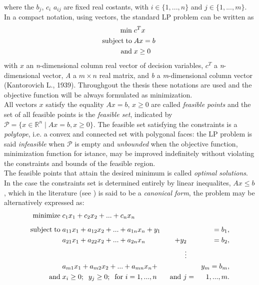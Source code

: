 \documentclass[a4paper,10 pt,titlepage,twoside]{book}
\theoremstyle{plain}
\theoremstyle{definition}
\theoremstyle{remark}
\begin{document}
where the $b_{j}$, $c_{i}$  $a_{ij}$ are fixed real costants, with $i \in\{1,...,n\}$ and $j\in\{1,...,m\}$.\\ In a compact notation, using vectors, the standard LP problem can be written as
\begin{equation}\label{(Prim)}
 \begin{split}
\min\;&c^{T}x\\
\text{subject\;to\;}&Ax= b\;\\\text{and\;}&x\geq0
 \end{split}
\end{equation}
with $x$ an \textit{n}-dimensional column real vector of decision variables, $c^
{T}$ a \textit{n}-dimensional vector, \textit{A} a $m \times n$ real matrix, and \textit{b} a \textit{m}-dimensional column vector (Kantorovich L., 1939).
Throughgout the thesis these notations are used and the objective function will be always formulated as minimization.\\
All vectors $x$ satisfy the equality $Ax = b$, $x\geq0$ are called \textit{feasible points} and the set of all feasible points is the \textit{feasible set}, indicated by $\mathcal{P}=\lbrace x\in\mathbb{R}^{n}\; |\; Ax = b , x \geq0\rbrace$. The feasible set satisfying the constraints is a \textit{polytope}, i.e. a convex and connected set with polygonal faces: the LP problem is said \textit{infeasible} when $\mathcal{P}$ is empty and \textit{unbounded} when the objective function, minimization function for istance, may be improved indefinitely without violating the constraints and bounds of the feasible region.\\The feasible points that attain the desired minimum is
called \textit{optimal solutions}.\\
In the case the constraints set is determined entirely by linear inequalites, $Ax \leq b$, which in the literature (see \cite{W}) is said to be a \textit{canonical form}, the problem may be alternatively expressed as:
\begin{alignat*}{3}
\text{minimize\;}&c_1 x_1 + c_2 x_2+ ...+c_n x_n&&&\\[1.8mm]
\text{subject\;to\;}&a_{11} x_1 +a_{12}x_2 + ... +a_{1n}x_n +y_{1}&&&= b_1,\\
		   	&a_{21}x_1+a_{22}x_2+ ... +a_{2n}x_n&+y_{2}&&= b_2,\\
&&\;\;\;\vdots&&\\
&a_{m1}x_1+a_{m2}x_2+ ... +a_{mn}x_n+&&&y_{m}=b_m,\\
\text{and} \;& x_{i} \geq 0;\;\; y_{j} \geq 0; \text{\;\;for }i = 1,...,n&\text{ and }j&=&1,...,m.
\end{alignat*}
\end{document}
